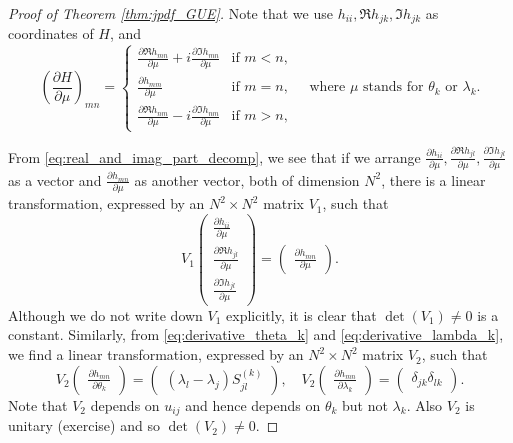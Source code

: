 \documentclass[11pt, a4paper]{article}
\numberwithin{equation}{section}
\theoremstyle{definition}
\theoremstyle{remark}
\begin{document}
\begin{proof}[Proof of Theorem \ref{thm:jpdf_GUE}]
  Note that we use $h_{ii}, \Re h_{jk}, \Im h_{jk}$ as coordinates of $H$, and
  \begin{equation} \label{eq:real_and_imag_part_decomp}
    \left( \frac{\partial H}{\partial \mu} \right)_{mn} =
    \begin{cases}
      \frac{\partial \Re h_{mn}}{\partial \mu} + i \frac{\partial \Im h_{mn}}{\partial \mu} & \text{if $m < n$}, \\
      \frac{\partial h_{mm}}{\partial \mu} & \text{if $m = n$}, \\
      \frac{\partial \Re h_{nm}}{\partial \mu} - i \frac{\partial \Im h_{nm}}{\partial \mu} & \text{if $m > n$},
    \end{cases}
    \quad \text{where $\mu$ stands for $\theta_k$ or $\lambda_k$.}
  \end{equation}

  From \eqref{eq:real_and_imag_part_decomp}, we see that if we arrange $\frac{\partial h_{ii}}{\partial \mu}, \frac{\partial \Re h_{jl}}{\partial \mu}, \frac{\partial \Im h_{jl}}{\partial \mu}$ as a vector and $\frac{\partial h_{mn}}{\partial \mu}$ as another vector, both of dimension $N^2$, there is a linear transformation, expressed by an $N^2 \times N^2$ matrix $V_1$, such that
  \begin{equation}
    V_1
    \begin{pmatrix}
      \frac{\partial h_{ii}}{\partial \mu} \\
      \frac{\partial \Re h_{jl}}{\partial \mu} \\
      \frac{\partial \Im h_{jl}}{\partial \mu}
    \end{pmatrix}
    =
    \begin{pmatrix}
      \frac{\partial h_{mn}}{\partial \mu}
    \end{pmatrix}.
  \end{equation}
  Although we do not write down $V_1$ explicitly, it is clear that $\det(V_1) \neq 0$ is a constant. Similarly, from \eqref{eq:derivative_theta_k} and \eqref{eq:derivative_lambda_k}, we find a linear transformation, expressed by an $N^2 \times N^2$ matrix $V_2$, such that
  \begin{equation}
    V_2
    \begin{pmatrix}
      \frac{\partial h_{mn}}{\partial \theta_k}
    \end{pmatrix}
    =
    \begin{pmatrix}
      (\lambda_l - \lambda_j) S^{(k)}_{jl}
    \end{pmatrix},
    \quad
    V_2
    \begin{pmatrix}
      \frac{\partial h_{mn}}{\partial \lambda_k}
    \end{pmatrix}
    =
    \begin{pmatrix}
      \delta_{jk} \delta_{lk}
    \end{pmatrix}.
  \end{equation}
  Note that $V_2$ depends on $u_{ij}$ and hence depends on $\theta_k$ but not $\lambda_k$. Also $V_2$ is unitary (exercise) and so $\det(V_2) \neq 0$.
  

\end{proof}
\end{document}
